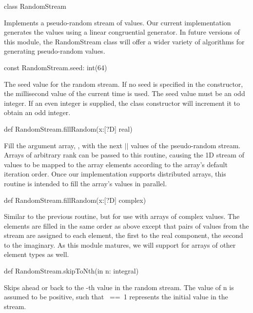 \begin{protohead}
class RandomStream
\end{protohead}
\begin{protobody}
Implements a pseudo-random stream of values.  Our current
implementation generates the values using a linear congruential
generator.  In future versions of this module, the RandomStream class
will offer a wider variety of algorithms for generating pseudo-random
values.
\end{protobody}

\begin{protohead}
const RandomStream.seed: int(64)
\end{protohead}
\begin{protobody}
The seed value for the random stream.  If no seed is specified in the
constructor, the millisecond value of the current time is used.  The
seed value must be an odd integer.  If an even integer is supplied,
the class constructor will increment it to obtain an odd integer.
\end{protobody}

\begin{protohead}
def RandomStream.fillRandom(x:[?D] real)
\end{protohead}
\begin{protobody}
Fill the argument array, , with the next $|$$|$ values
of the pseudo-random stream.  Arrays of arbitrary rank can be passed
to this routine, causing the 1D stream of values to be mapped to the
array elements according to the array's default iteration order.  Once
our implementation supports distributed arrays, this routine is
intended to fill the array's values in parallel.
\end{protobody}

\begin{protohead}
def RandomStream.fillRandom(x:[?D] complex)
\end{protohead}
\begin{protobody}
Similar to the previous routine, but for use with arrays of complex
values.  The elements are filled in the same order as above except
that pairs of values from the stream are assigned to each element, the
first to the real component, the second to the imaginary.  As this
module matures, we will support  for arrays of other
element types as well.
\end{protobody}

\begin{protohead}
def RandomStream.skipToNth(in n: integral)
\end{protohead}
\begin{protobody}
Skips ahead or back to the -th value in the
random stream.  The value of n is assumed to be positive, such that
~==~1 represents the initial value in the stream.
\end{protobody}

